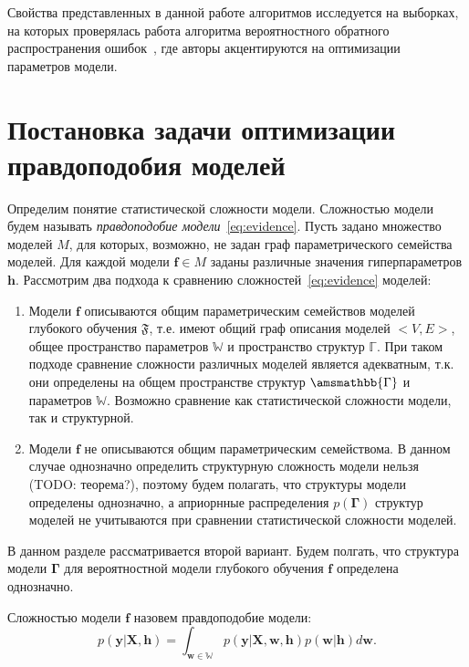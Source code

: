 Свойства представленных в данной работе  алгоритмов исследуется на выборках, на которых проверялась работа алгоритма вероятностного обратного распространения ошибок~\cite{pbp}, где авторы акцентируются на оптимизации параметров модели. 


\section{Постановка задачи оптимизации правдоподобия моделей}
Определим понятие статистической сложности модели. Сложностью модели будем называть \textit{правдоподобие модели}~\eqref{eq:evidence}.
Пусть задано множество моделей $M$, для которых, возможно, не задан граф параметрического семейства моделей.
Для каждой модели $\mathbf{f} \in {M}$ заданы различные значения гиперпараметров $\mathbf{h}$. 
Рассмотрим два подхода к сравнению сложностей~\eqref{eq:evidence} моделей:
\begin{enumerate}
\item Модели $\mathbf{f}$ описываются общим параметрическим семействов моделей глубокого обучения $\mathfrak{F}$, т.е. имеют общий граф описания моделей $<V,E>$, общее пространство параметров $\mathbb{W}$ и пространство структур $\mathbb{\Gamma}$. При таком подходе сравнение сложности различных моделей является  адекватным, т.к. они определены на общем пространстве структур $\amsmathbb{\Gamma}$ и параметров $\mathbb{W}$. Возможно сравнение как статистической сложности модели, так и структурной.
\item Модели $\mathbf{f}$  не описываются общим параметрическим семействома. В данном случае однозначно определить структурную сложность модели нельзя (TODO: теорема?), поэтому будем полагать, что структуры модели определены однозначно, а априорнные распределения $p(\boldsymbol{\Gamma})$ структур моделей не учитываются при сравнении статистической сложности моделей.
\end{enumerate}
В данном разделе рассматривается второй вариант. Будем полгать, что структура модели $\boldsymbol{\Gamma}$ для вероятностной модели глубокого обучения $\mathbf{f}$ определена однозначно. 

\begin{defin} Сложностью модели $\mathbf{f}$ назовем правдоподобие модели:
\begin{equation}
\label{eq:model_evidence}
	p(\mathbf{y}|\mathbf{X},\mathbf{h}) = \int_{\mathbf{w} \in \mathbb{W}} p(\mathbf{y}|\mathbf{X},\mathbf{w}, \mathbf{h})p(\mathbf{w}|\mathbf{h})d\mathbf{w}.
\end{equation}
\end{defin}

